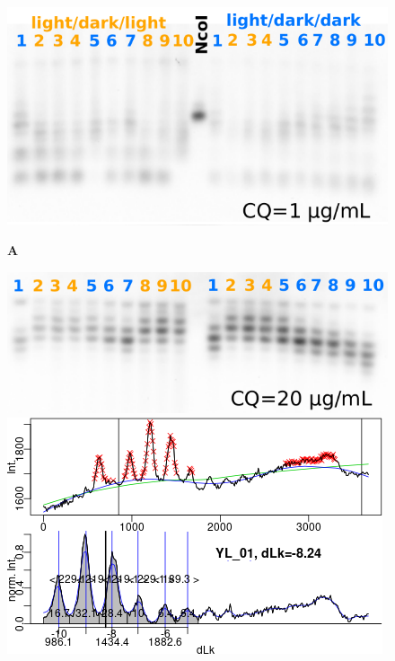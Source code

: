 \documentclass[10pt,a4]{article}
\begin{document}
\begin{figure}[ht!]
  \begin{minipage}{.49\textwidth}
    \includegraphics[width=\textwidth]{figures/diurnal/20130620_pCA_CQ1_annotated.pdf}
    
    \vspace{-.5cm}
    \textbf{A}
    \vspace{.5cm}
    
    \includegraphics[width=\textwidth]{figures/diurnal/20130821_pCA_CQ20_annotated.pdf}
  \end{minipage}
  \begin{minipage}{.45\textwidth}
    \includegraphics[width=\textwidth]{figures/diurnal/YL_01_cropped.png}
   

\end{minipage}
\end{figure}
\end{document}
